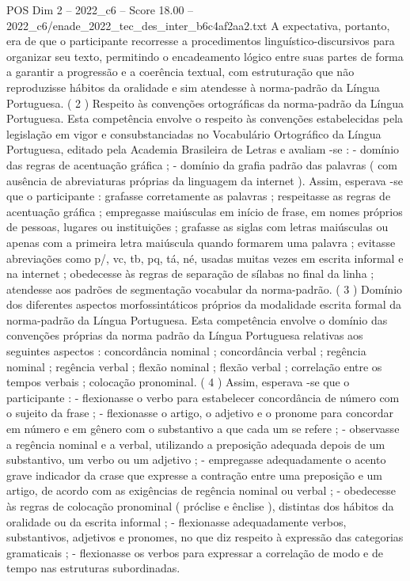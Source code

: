 \begin{textsample}{POS Dim 2 – 2022\_c6 – Score 18.00 – 2022\_c6/enade\_2022\_tec\_des\_inter\_b6c4af2aa2.txt}
A expectativa, portanto, era de que o participante recorresse a procedimentos linguístico-discursivos para organizar seu texto, permitindo o encadeamento lógico entre suas partes de forma a garantir a progressão e a coerência textual, com estruturação que não reproduzisse hábitos da oralidade e sim atendesse à norma-padrão da Língua Portuguesa. ( 2 ) Respeito às convenções ortográficas da norma-padrão da Língua Portuguesa.
Esta competência envolve o respeito às convenções estabelecidas pela legislação em vigor e consubstanciadas no Vocabulário Ortográfico da Língua Portuguesa, editado pela Academia Brasileira de Letras e avaliam -se : - domínio das regras de acentuação gráfica ; - domínio da grafia padrão das palavras ( com ausência de abreviaturas próprias da linguagem da internet ).
Assim, esperava -se que o participante : grafasse corretamente as palavras ; respeitasse as regras de acentuação gráfica ; empregasse maiúsculas em início de frase, em nomes próprios de pessoas, lugares ou instituições ; grafasse as siglas com letras maiúsculas ou apenas com a primeira letra maiúscula quando formarem uma palavra ; evitasse abreviações como p/, vc, tb, pq, tá, né, usadas muitas vezes em escrita informal e na internet ; obedecesse às regras de separação de sílabas no final da linha ; atendesse aos padrões de segmentação vocabular da norma-padrão. ( 3 ) Domínio dos diferentes aspectos morfossintáticos próprios da modalidade escrita formal da norma-padrão da Língua Portuguesa.
Esta competência envolve o domínio das convenções próprias da norma padrão da Língua Portuguesa relativas aos seguintes aspectos : concordância nominal ; concordância verbal ; regência nominal ; regência verbal ; flexão nominal ; flexão verbal ; correlação entre os tempos verbais ; colocação pronominal. ( 4 ) Assim, esperava -se que o participante : - flexionasse o verbo para estabelecer concordância de número com o sujeito da frase ; - flexionasse o artigo, o adjetivo e o pronome para concordar em número e em gênero com o substantivo a que cada um se refere ; - observasse a regência nominal e a verbal, utilizando a preposição adequada depois de um substantivo, um verbo ou um adjetivo ; - empregasse adequadamente o acento grave indicador da crase que expresse a contração entre uma preposição e um artigo, de acordo com as exigências de regência nominal ou verbal ; - obedecesse às regras de colocação pronominal ( próclise e ênclise ), distintas dos hábitos da oralidade ou da escrita informal ; - flexionasse adequadamente verbos, substantivos, adjetivos e pronomes, no que diz respeito à expressão das categorias gramaticais ; - flexionasse os verbos para expressar a correlação de modo e de tempo nas estruturas subordinadas.

\end{textsample}
